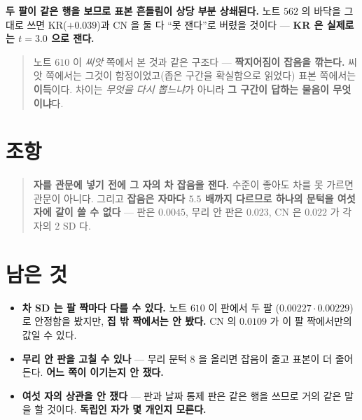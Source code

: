 \documentclass[11pt]{article}
\begin{document}
\textbf{두 팔이 같은 행을 보므로 표본 흔들림이 상당 부분 상쇄된다.} 노트
$562$ 의 바닥을 그대로 쓰면 KR($+0.039$)과 CN 을 둘 다 ``못 잰다''로
버렸을 것이다 --- \textbf{KR 은 실제로는 $t{=}3.0$ 으로 잰다.}

\begin{quote}
노트 $610$ 이 \emph{씨앗} 쪽에서 본 것과 같은 구조다 --- \textbf{짝지어짐이
잡음을 깎는다.} 씨앗 쪽에서는 그것이 함정이었고(좁은 구간을 확실함으로
읽었다) 표본 쪽에서는 \textbf{이득}이다. 차이는 \emph{무엇을 다시
뽑느냐}가 아니라 \textbf{그 구간이 답하는 물음이 무엇이냐}다.
\end{quote}

\section*{조항}

\begin{quote}
\textbf{자를 관문에 넣기 전에 그 자의 차 잡음을 잰다.} 수준이 좋아도 차를
못 가르면 관문이 아니다. 그리고 \textbf{잡음은 자마다 $5.5$ 배까지
다르므로 하나의 문턱을 여섯 자에 같이 쓸 수 없다} --- 판은 $0.0045$,
무리 안 판은 $0.023$, CN 은 $0.022$ 가 각자의 $2$ SD 다.
\end{quote}

\section*{남은 것}

\begin{itemize}
\item \textbf{차 SD 는 팔 짝마다 다를 수 있다.} 노트 $610$ 이 판에서 두 팔
($0.00227 \cdot 0.00229$)로 안정함을 봤지만, \textbf{집 밖 짝에서는
안 봤다.} CN 의 $0.0109$ 가 이 팔 짝에서만의 값일 수 있다.
\item \textbf{무리 안 판을 고칠 수 있나} --- 무리 문턱 $8$ 을 올리면
잡음이 줄고 표본이 더 줄어든다. \textbf{어느 쪽이 이기는지 안 쟀다.}
\item \textbf{여섯 자의 상관을 안 쟀다} --- 판과 날짜 통제 판은 같은 행을
쓰므로 거의 같은 말을 할 것이다. \textbf{독립인 자가 몇 개인지 모른다.}
\end{itemize}
\end{document}
